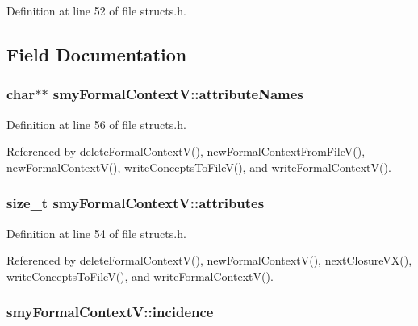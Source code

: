 \-Definition at line 52 of file structs.\-h.



\subsection{\-Field \-Documentation}
\hypertarget{structsmyFormalContextV_a10705bdd28894f84042e9c1be7f697c6}{
\subsubsection[{attribute\-Names}]{\setlength{\rightskip}{0pt plus 5cm}char$\ast$$\ast$ {\bf smy\-Formal\-Context\-V\-::attribute\-Names}}}\label{structsmyFormalContextV_a10705bdd28894f84042e9c1be7f697c6}


\-Definition at line 56 of file structs.\-h.



\-Referenced by delete\-Formal\-Context\-V(), new\-Formal\-Context\-From\-File\-V(), new\-Formal\-Context\-V(), write\-Concepts\-To\-File\-V(), and write\-Formal\-Context\-V().

\hypertarget{structsmyFormalContextV_a94d6bf1233ed7e796e71595d53e85265}{
\subsubsection[{attributes}]{\setlength{\rightskip}{0pt plus 5cm}size\-\_\-t {\bf smy\-Formal\-Context\-V\-::attributes}}}\label{structsmyFormalContextV_a94d6bf1233ed7e796e71595d53e85265}


\-Definition at line 54 of file structs.\-h.



\-Referenced by delete\-Formal\-Context\-V(), new\-Formal\-Context\-V(), next\-Closure\-V\-X(), write\-Concepts\-To\-File\-V(), and write\-Formal\-Context\-V().

\hypertarget{structsmyFormalContextV_a1cc9b0c27ade0450dfe33b04c1f767b8}{
\subsubsection[{incidence}]{ {\bf smy\-Formal\-Context\-V\-::incidence}}}\label{structsmyFormalContextV_a1cc9b0c27ade0450dfe33b04c1f767b8}


